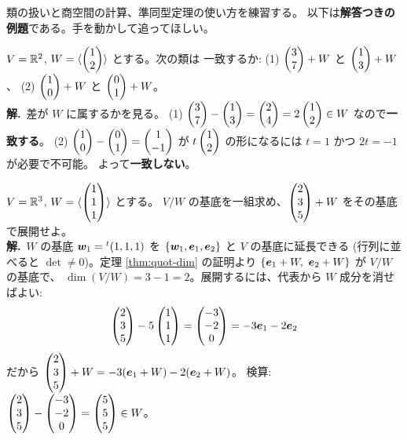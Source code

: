 類の扱いと商空間の計算、準同型定理の使い方を練習する。
以下は\textbf{解答つきの例題}である。手を動かして追ってほしい。

\begin{rei}[例題・基本(類の一致判定)]\label{rei:quot-same}
$V = \mathbb{R}^2$, $W = \langle \begin{pmatrix}1 \\ 2\end{pmatrix} \rangle$ とする。次の類は
一致するか:
(1) $\begin{pmatrix}3 \\ 7\end{pmatrix} + W$ と $\begin{pmatrix}1 \\ 3\end{pmatrix} + W$、
(2) $\begin{pmatrix}1 \\ 0\end{pmatrix} + W$ と $\begin{pmatrix}0 \\ 1\end{pmatrix} + W$。\\
\textbf{解.}\ 差が $W$ に属するかを見る。
(1) $\begin{pmatrix}3 \\ 7\end{pmatrix} - \begin{pmatrix}1 \\ 3\end{pmatrix} = \begin{pmatrix}2 \\ 4\end{pmatrix} = 2\begin{pmatrix}1 \\ 2\end{pmatrix} \in W$
なので\textbf{一致する}。
(2) $\begin{pmatrix}1 \\ 0\end{pmatrix} - \begin{pmatrix}0 \\ 1\end{pmatrix} = \begin{pmatrix}1 \\ -1\end{pmatrix}$ が
$t\begin{pmatrix}1 \\ 2\end{pmatrix}$ の形になるには $t = 1$ かつ $2t = -1$ が必要で不可能。
よって\textbf{一致しない}。
\end{rei}

\begin{rei}[例題・基本(商空間の基底と座標)]\label{rei:quot-basis}
$V = \mathbb{R}^3$, $W = \langle \begin{pmatrix}1 \\ 1 \\ 1\end{pmatrix} \rangle$ とする。
$V/W$ の基底を一組求め、$\begin{pmatrix}2 \\ 3 \\ 5\end{pmatrix} + W$ をその基底で展開せよ。\\
\textbf{解.}\ $W$ の基底 $\bm{w}_1 = {}^t(1,1,1)$ を
$\{\bm{w}_1, \bm{e}_1, \bm{e}_2\}$ と $V$ の基底に延長できる
(行列に並べると $\det \neq 0$)。定理 \ref{thm:quot-dim} の証明より
$\{\bm{e}_1 + W,\ \bm{e}_2 + W\}$ が $V/W$ の基底で、
$\dim(V/W) = 3 - 1 = 2$。展開するには、代表から $W$ 成分を消せばよい:
\[
\begin{pmatrix}2 \\ 3 \\ 5\end{pmatrix} - 5\begin{pmatrix}1 \\ 1 \\ 1\end{pmatrix} = \begin{pmatrix}-3 \\ -2 \\ 0\end{pmatrix}
= -3\bm{e}_1 - 2\bm{e}_2
\]
だから $\begin{pmatrix}2 \\ 3 \\ 5\end{pmatrix} + W = -3(\bm{e}_1 + W) - 2(\bm{e}_2 + W)$。
検算:$\begin{pmatrix}2 \\ 3 \\ 5\end{pmatrix} - \begin{pmatrix}-3 \\ -2 \\ 0\end{pmatrix} = \begin{pmatrix}5 \\ 5 \\ 5\end{pmatrix} \in W$。
\end{rei}

